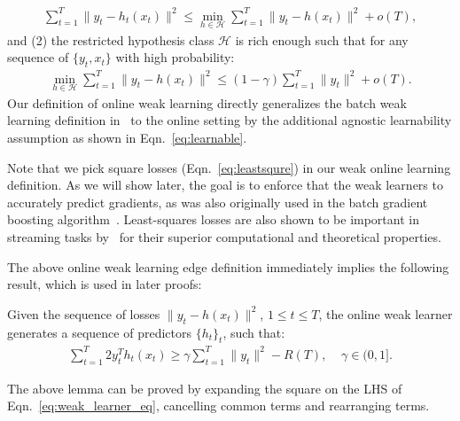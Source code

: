 \begin{align}
\sum_{t=1}^T \|y_t - h_t(x_t)\|^2\leq \min_{h\in\mathcal{H}}\sum_{t=1}^T \|y_t-h(x_t)\|^2 + o(T),
\label{eq:learnable}
\end{align} 
and (2) the restricted hypothesis class $\mathcal{H}$ is rich enough such that for any sequence of $\{y_t, x_t\}$ with high probability:
\begin{align}
\label{eq:leastsqure}
\min_{h\in\mathcal{H}}\sum_{t=1}^T\|y_t - h(x_t)\|^2 \leq (1-\gamma)\sum_{t=1}^T\|y_t\|^2 + o(T).
\end{align} 
Our definition of online weak learning directly generalizes the batch weak learning definition in~\citep{grubb2011generalized} to the online setting by the additional agnostic learnability assumption as shown in Eqn.~\ref{eq:learnable}.





Note that we pick square losses (Eqn.~\ref{eq:leastsqure}) in our weak online learning definition. As we will show later, the goal is to enforce that the weak learners to accurately predict gradients, as was also originally used in the batch gradient boosting algorithm~\citep{friedman2001greedy}. Least-squares losses are also shown to be important in streaming tasks by~\citep{opauc} for their superior computational and theoretical properties. 

The above online weak learning edge definition immediately implies the following result, which is used in later proofs:
\begin{lemma}
\label{lemma:from_weak_learning}
Given the sequence of losses $\|y_t - h(x_t)\|^2$, $1\leq t\leq T$, the online weak learner generates a sequence of predictors $\{h_t\}_t$, such that:
\begin{align}
\sum_{t=1}^T 2y_t^T h_t(x_t) \geq \gamma\sum_{t=1}^T \|y_t\|^2 - R(T), \;\;\;\; \gamma\in (0,1].
\end{align} 
\end{lemma}
The above lemma can be proved by expanding the square on the LHS of Eqn.~\ref{eq:weak_learner_eq}, cancelling common terms and rearranging terms. 



